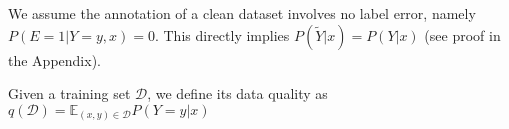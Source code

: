     \begin{assumption}%
        \label{assumption:clean-dataset}
        We assume the annotation of a clean dataset involves no label error, namely $P(E=1|Y=y, x) = 0$. This directly implies $P(\tilde{Y}|x) = P(Y|x)$ (see proof in the Appendix).
    \end{assumption}
    
    \begin{definition}
    \label{definition:data-quality}
    Given a training set $\mathcal{D}$, we define its data quality as $q(\mathcal{D}) = \mathbb{E}_{(x, y) \in \mathcal{D}} P(Y=y|x)$
    \end{definition}
    
    
    
